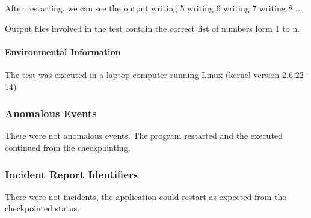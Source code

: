 After restarting, we can see the output
writing 5
writing 6
writing 7
writing 8
...

Output files involved in the test contain the correct list of numbers form 1 to n.


\paragraph{Environmental Information}
The test was executed in a laptop computer running Linux (kernel version 2.6.22-14) 

\subsubsection{Anomalous Events}
There were not anomalous events. The program restarted and the executed continued from the checkpointing.

\subsubsection{Incident Report Identifiers}
There were not incidents, the application could restart as expected from tho checkpointed status.
